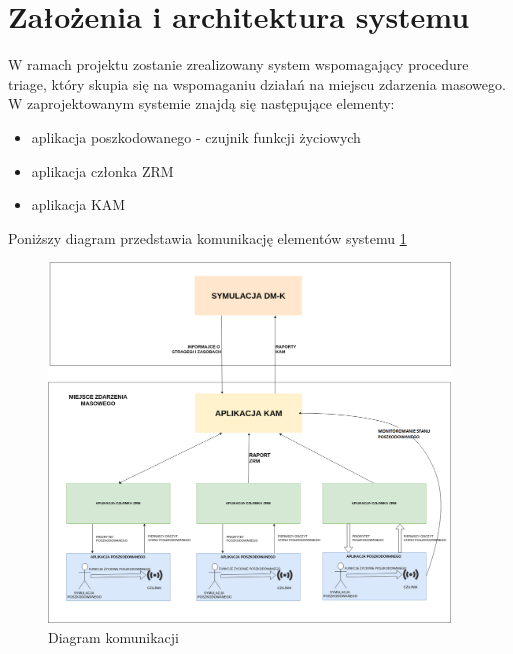 \documentclass[11pt]{report}
\begin{document}
\section{Założenia i architektura systemu}
W ramach projektu zostanie zrealizowany system wspomagający procedure triage, który skupia się na wspomaganiu działań na miejscu zdarzenia masowego. W zaprojektowanym systemie znajdą się następujące elementy:
\begin{itemize}
    \item aplikacja poszkodowanego - czujnik funkcji życiowych
    \item aplikacja członka ZRM
    \item aplikacja KAM
\end{itemize}
Poniższy diagram przedstawia komunikację elementów systemu \ref{fig:arch}
\begin{figure}[h!]
  \centering
    \includegraphics[width=0.95\textwidth]{img/arch.png}
  \caption{Diagram komunikacji}
  \label{fig:arch}
\end{figure}
\newpage
\end{document}
